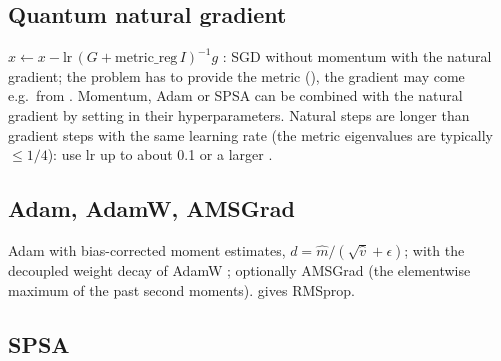 \subsection{Quantum natural gradient}

$x\leftarrow x-\mathrm{lr}\,(G+\mathrm{metric\_reg}\,I)^{-1}g$ \cite{optimize:stokes2020}: SGD without momentum with the natural
gradient; the problem has to provide the metric (), the gradient may come e.g.\ from .
Momentum, Adam or SPSA can be combined with the natural gradient by setting  in their hyperparameters.
Natural steps are longer than gradient steps with the same learning rate (the metric eigenvalues are typically $\le1/4$): use
lr up to about 0.1 or a larger .
\begin{lareference}
\end{lareference}

\subsection{Adam, AdamW, AMSGrad}

Adam \cite{optimize:kingma2015} with bias-corrected moment estimates, $d=\hat m/(\sqrt{\hat v}+\epsilon)$; with
 the decoupled weight decay of AdamW \cite{optimize:loshchilov2019}; optionally AMSGrad
\cite{optimize:reddi2018} (the elementwise maximum of the past second moments).  gives RMSprop.
\begin{lareference}
\end{lareference}

\subsection{SPSA}

